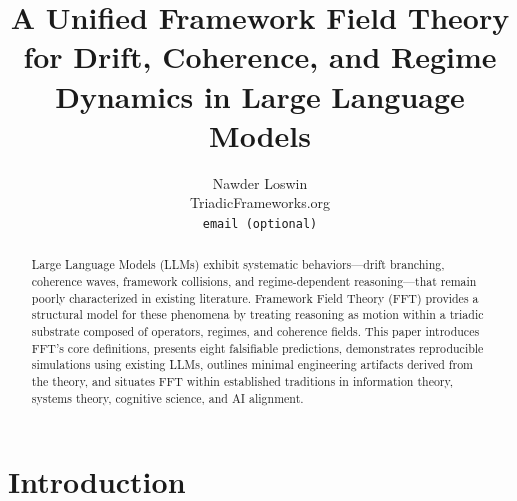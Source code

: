 \documentclass{article}
\title{A Unified Framework Field Theory for Drift, Coherence, and Regime Dynamics in Large Language Models}
\author{
  Nawder Loswin \\
  TriadicFrameworks.org \\
  \texttt{email (optional)} \\
}
\begin{document}
\maketitle

\begin{abstract}
Large Language Models (LLMs) exhibit systematic behaviors---drift branching, coherence waves, framework collisions, and regime-dependent reasoning---that remain poorly characterized in existing literature. Framework Field Theory (FFT) provides a structural model for these phenomena by treating reasoning as motion within a triadic substrate composed of operators, regimes, and coherence fields. This paper introduces FFT's core definitions, presents eight falsifiable predictions, demonstrates reproducible simulations using existing LLMs, outlines minimal engineering artifacts derived from the theory, and situates FFT within established traditions in information theory, systems theory, cognitive science, and AI alignment.
\end{abstract}

\section{Introduction}
\end{document}
